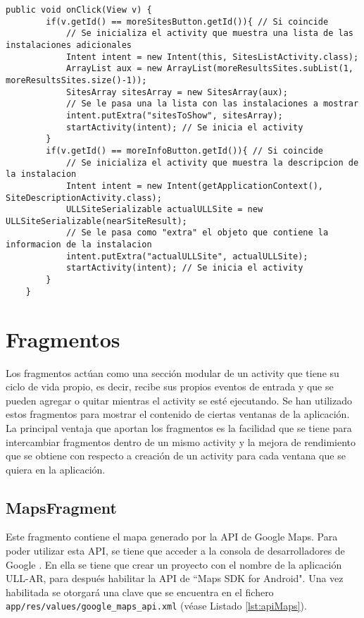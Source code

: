 \begin{lstlisting}[caption={Fichero \texttt{ARNavigation.java}, código para manejar los eventos de los botones.},  label={lst:infobutton}]
    public void onClick(View v) {
        if(v.getId() == moreSitesButton.getId()){ // Si coincide
            // Se inicializa el activity que muestra una lista de las instalaciones adicionales
            Intent intent = new Intent(this, SitesListActivity.class);
            ArrayList aux = new ArrayList(moreResultsSites.subList(1, moreResultsSites.size()-1));
            SitesArray sitesArray = new SitesArray(aux);
            // Se le pasa una la lista con las instalaciones a mostrar
            intent.putExtra("sitesToShow", sitesArray);
            startActivity(intent); // Se inicia el activity
        }
        if(v.getId() == moreInfoButton.getId()){ // Si coincide
            // Se inicializa el activity que muestra la descripcion de la instalacion
            Intent intent = new Intent(getApplicationContext(), SiteDescriptionActivity.class);
            ULLSiteSerializable actualULLSite = new ULLSiteSerializable(nearSiteResult);
            // Se le pasa como "extra" el objeto que contiene la informacion de la instalacion
            intent.putExtra("actualULLSite", actualULLSite);
            startActivity(intent); // Se inicia el activity
        }
    }
\end{lstlisting}

\section{Fragmentos}

Los fragmentos \cite{URL::fragment} actúan como una sección modular de un activity que tiene su ciclo de vida propio, es decir, recibe sus propios eventos de entrada y que se pueden agregar o quitar mientras el activity se esté ejecutando. Se han utilizado estos fragmentos para mostrar el contenido de ciertas ventanas de la aplicación. La principal ventaja que  aportan los fragmentos es la facilidad que se tiene para intercambiar fragmentos dentro de un mismo activity y la mejora de rendimiento que se obtiene con respecto a creación de un activity para cada ventana que se quiera en la aplicación.

\subsection{MapsFragment}
       
Este fragmento contiene el mapa generado por la API de Google Maps. Para poder utilizar esta API, se tiene que acceder a la consola de desarrolladores de Google \cite{URL::consoleGoogle}. En ella se tiene que crear un proyecto con el nombre de la aplicación ULL-AR, para después habilitar la API de ``Maps SDK for Android". Una vez habilitada se otorgará una clave que se encuentra en el fichero \texttt{app/res/values/google\_maps\_api.xml} (véase Listado \ref{lst:apiMaps}).

